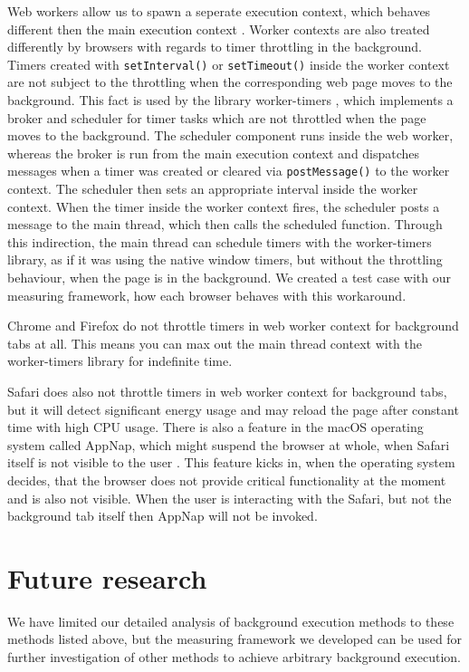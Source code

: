 \documentclass[
	ngerman,
	ruledheaders=section,%
	class=report,%
	thesis={type=bachelor},%
	accentcolor=9c,%
	custommargins=true,%
	marginpar=false,%
	parskip=half-,%
	fontsize=11pt,%
]{tudapub}
\begin{document}
  Web workers allow us to spawn a seperate execution context, which behaves different then the main execution context \cite{mdn-worker}. Worker contexts are also treated differently by browsers with regards to timer throttling in the background. Timers created with \texttt{setInterval()} or \texttt{setTimeout()} inside the worker context are not subject to the throttling when the corresponding web page moves to the background. This fact is used by the library worker-timers \cite{worker-timers}, which implements a broker and scheduler for timer tasks which are not throttled when the page moves to the background. The scheduler component runs inside the web worker, whereas the broker is run from the main execution context and dispatches messages when a timer was created or cleared via \texttt{postMessage()} to the worker context. The scheduler then sets an appropriate interval inside the worker context. When the timer inside the worker context fires, the scheduler posts a message to the main thread, which then calls the scheduled function. Through this indirection, the main thread can schedule timers with the worker-timers library, as if it was using the native window timers, but without the throttling behaviour, when the page is in the background. We created a test case with our measuring framework, how each browser behaves with this workaround.
  
  Chrome and Firefox do not throttle timers in web worker context for background tabs at all. This means you can max out the main thread context with the worker-timers library for indefinite time.

  Safari does also not throttle timers in web worker context for background tabs, but it will detect significant energy usage and may reload the page after constant time with high CPU usage. There is also a feature in the macOS operating system called AppNap, which might suspend the browser at whole, when Safari itself is not visible to the user \cite{osx-app-nap}. This feature kicks in, when the operating system decides, that the browser does not provide critical functionality at the moment and is also not visible. When the user is interacting with the Safari, but not the background tab itself then AppNap will not be invoked.
  

  \section{Future research}

  We have limited our detailed analysis of background execution methods to these methods listed above, but the measuring framework we developed can be used for further investigation of other methods to achieve arbitrary background execution.
\end{document}
